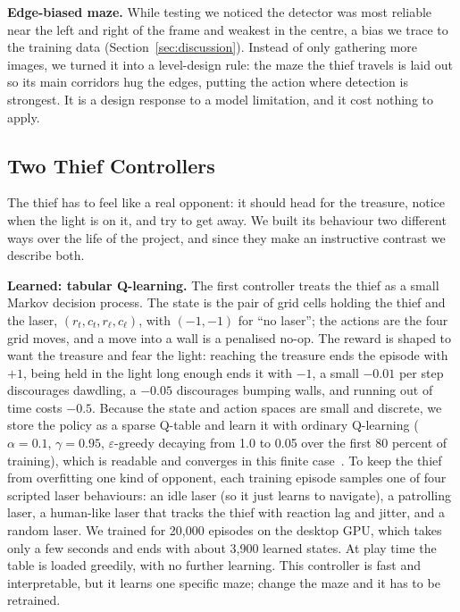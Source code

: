 \documentclass[conference]{IEEEtran}
\begin{document}
\noindent\textbf{Edge-biased maze.} While testing we noticed the detector was most
reliable near the left and right of the frame and weakest in the centre, a bias we
trace to the training data (Section~\ref{sec:discussion}). Instead of only
gathering more images, we turned it into a level-design rule: the maze the thief
travels is laid out so its main corridors hug the edges, putting the action where
detection is strongest. It is a design response to a model limitation, and it cost
nothing to apply.

\subsection{Two Thief Controllers}\label{sec:adversaries}
The thief has to feel like a real opponent: it should head for the treasure,
notice when the light is on it, and try to get away. We built its behaviour two
different ways over the life of the project, and since they make an instructive
contrast we describe both.

\noindent\textbf{Learned: tabular Q-learning.} The first controller treats the
thief as a small Markov decision process. The state is the pair of grid cells
holding the thief and the laser, $(r_t,c_t,r_\ell,c_\ell)$, with $(-1,-1)$ for
``no laser''; the actions are the four grid moves, and a move into a wall is a
penalised no-op. The reward is shaped to want the treasure and fear the light:
reaching the treasure ends the episode with $+1$, being held in the light long
enough ends it with $-1$, a small $-0.01$ per step discourages dawdling, a $-0.05$
discourages bumping walls, and running out of time costs $-0.5$. Because the state
and action spaces are small and discrete, we store the policy as a sparse Q-table
and learn it with ordinary Q-learning ($\alpha=0.1$, $\gamma=0.95$,
$\varepsilon$-greedy decaying from 1.0 to 0.05 over the first 80 percent of
training), which is readable and converges in this finite
case~\cite{watkins1992,sutton2018}. To keep the thief from overfitting one kind of
opponent, each training episode samples one of four scripted laser behaviours: an
idle laser (so it just learns to navigate), a patrolling laser, a human-like laser
that tracks the thief with reaction lag and jitter, and a random laser. We trained
for 20{,}000 episodes on the desktop GPU, which takes only a few seconds and ends
with about 3{,}900 learned states. At play time the table is loaded greedily, with
no further learning. This controller is fast and interpretable, but it learns one
specific maze; change the maze and it has to be retrained.
\end{document}
